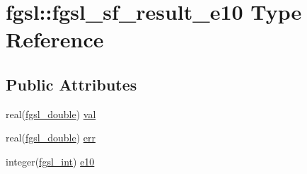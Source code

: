 \hypertarget{structfgsl_1_1fgsl__sf__result__e10}{\section{fgsl\-:\-:fgsl\-\_\-sf\-\_\-result\-\_\-e10 Type Reference}
\label{structfgsl_1_1fgsl__sf__result__e10}
}
\subsection*{Public Attributes}
\begin{DoxyCompactItemize}
\item 
real(\hyperlink{classfgsl_a9af5113378e0f000eb479d3f90196ddf}{fgsl\-\_\-double}) \hyperlink{structfgsl_1_1fgsl__sf__result__e10_a5b7c6b37adb7724bdf69637b74f65395}{val}
\item 
real(\hyperlink{classfgsl_a9af5113378e0f000eb479d3f90196ddf}{fgsl\-\_\-double}) \hyperlink{structfgsl_1_1fgsl__sf__result__e10_a3ae421b4307c79b813f7d70187290fd8}{err}
\item 
integer(\hyperlink{classfgsl_a222deda1d7a0c0e845ce4a683318efeb}{fgsl\-\_\-int}) \hyperlink{structfgsl_1_1fgsl__sf__result__e10_a9fd222d7b55ec57cb27b8659b09c13b0}{e10}
\end{DoxyCompactItemize}


